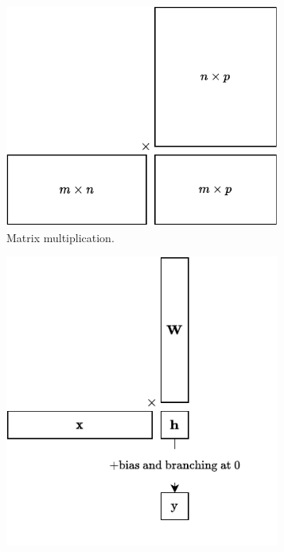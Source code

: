 \begin{figure}[t]
  \centering
  \begin{subfigure}[t]{0.45\textwidth}
    \includegraphics[width=0.99\textwidth]{figures/matmul.pdf}
    \caption{Matrix multiplication.}
    \label{fig:matmul}
	\end{subfigure}
	\begin{subfigure}[t]{0.45\textwidth}
    \includegraphics[width=0.99\textwidth]{figures/perceptron.pdf}

\end{subfigure}
\end{figure}
